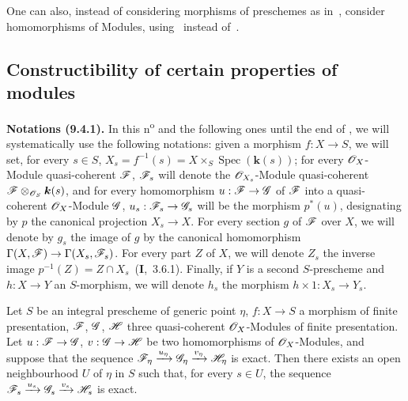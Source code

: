 One can also, instead of considering morphisms of preschemes as in~, consider homomorphisms of Modules, using~ instead of~.


\subsection{Constructibility of certain properties of modules}
\label{subsection:IV.9.4}

\begin{env}[9.4.1]
\label{IV.9.4.1}
\textbf{Notations (9.4.1).}
In this n\textsuperscript{o} and the following ones until the end of , we will systematically use the following notations: given a morphism $f:X\to S$, we will set, for every $s\in S$, $X_s=f^{-1}(s)=X\times_S\operatorname{Spec}(\boldsymbol{k}(s))$; for every $\mathscr{O}_X$-Module quasi-coherent $\mathscr{F}$, $\mathscr{F}_s$ will denote the $\mathscr{O}_{X_s}$-Module quasi-coherent $\mathscr{F}\otimes_{\mathscr{O}_S}\boldsymbol{k}(s)$, and for every homomorphism $u:\mathscr{F}\to\mathscr{G}$ of $\mathscr{F}$ into a quasi-coherent $\mathscr{O}_X$-Module $\mathscr{G}$, $u_s:\mathscr{F}_s\to\mathscr{G}_s$ will be the morphism $p^*(u)$, designating by $p$ the canonical projection $X_s\to X$.
For every section $g$ of $\mathscr{F}$ over $X$, we will denote by $g_s$ the image of $g$ by the canonical homomorphism $\Gamma(X,\mathscr{F})\to\Gamma(X_s,\mathscr{F}_s)$.
For every part $Z$ of $X$, we will denote $Z_s$ the inverse image $p^{-1}(Z)=Z\cap X_s$~(\textbf{I},~3.6.1).
Finally, if $Y$ is a second $S$-prescheme and $h:X\to Y$ an $S$-morphism, we will denote $h_s$ the morphism $h\times 1:X_s\to Y_s$.
\end{env}

\begin{proposition}[9.4.2]
\label{IV.9.4.2}
Let $S$ be an integral prescheme of generic point $\eta$, $f:X\to S$ a morphism of finite presentation, $\mathscr{F}$, $\mathscr{G}$, $\mathscr{H}$ three quasi-coherent $\mathscr{O}_X$-Modules of finite presentation.
Let $u:\mathscr{F}\to\mathscr{G}$, $v:\mathscr{G}\to\mathscr{H}$ be two homomorphisms of $\mathscr{O}_X$-Modules, and suppose that the sequence $\mathscr{F}_\eta\xrightarrow{u_\eta}\mathscr{G}_\eta\xrightarrow{v_\eta}\mathscr{H}_\eta$ is exact.
Then there exists an open neighbourhood $U$ of $\eta$ in $S$ such that, for every $s\in U$, the sequence $\mathscr{F}_s\xrightarrow{u_s}\mathscr{G}_s\xrightarrow{v_s}\mathscr{H}_s$ is exact.
\end{proposition}

